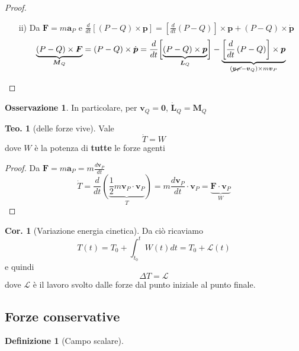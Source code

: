 \documentclass[a4paper,10pt]{article}
\theoremstyle{definition}
\theoremstyle{indentdefinition}
\newtheorem{defn}{Definizione}[section]
\theoremstyle{indenttheorem}
\newtheorem{thm}{Teo.}
\newtheorem{cor}{Cor.}
\theoremstyle{myremark}
\newtheorem*{rem*}{Osservazione}
\theoremstyle{indentgeneral}
\begin{document}
\begin{proof}
\begin{itemize}
    \item[ii)] Da $\boldsymbol{F}=m\boldsymbol{a}_{P}$ e $\frac{d}{dt}\left[\left(P-Q\right)\times\boldsymbol{p}\right]=\left[\frac{d}{dt}\left(P-Q\right)\right]\times\boldsymbol{p}+\left(P-Q\right)\times\dot{\boldsymbol{p}}$
    \[
\underset{\boldsymbol{M}_{Q}}{\underbrace{\left(P-Q\right)\times\boldsymbol{F}}}=\left(P-Q\right)\times\dot{\boldsymbol{p}}=\frac{d}{dt}\underset{\boldsymbol{L}_{Q}}{\left[\underbrace{\left(P-Q\right)\times\boldsymbol{p}}\right]}-\underset{\left(\cancel{\boldsymbol{v}_{P}}-\boldsymbol{v}_{Q}\right)\times m\boldsymbol{v}_{P}}{\underbrace{\left[\frac{d}{dt}\left(P-Q\right)\right]\times\boldsymbol{p}}}
\]
\end{itemize}
\end{proof}

\begin{rem*}
In particolare, per $\boldsymbol{v}_{Q}=\boldsymbol{0}$, $\dot{\boldsymbol{L}}_{Q}=\boldsymbol{M}_{Q}$
\end{rem*}

\begin{thm}[delle forze vive]
Vale $$\dot{T} =W$$ dove $W$ è la potenza di \textbf{tutte} le forze agenti
\end{thm}
\begin{proof}
    Da $\boldsymbol{F}=m\boldsymbol{a}_{P}=m\frac{d\boldsymbol{v}_{P}}{dt}$
\[
\dot{T}=\frac{d}{dt}\underset{T}{\left(\underbrace{\frac{1}{2}m\boldsymbol{v}_{P}\cdot\boldsymbol{v}_{P}}\right)}=m\frac{d\boldsymbol{v}_{P}}{dt}\cdot\boldsymbol{v}_{P}=\underset{W}{\underbrace{\boldsymbol{F}\cdot\boldsymbol{v}_{P}}}
\] 
\end{proof}

\begin{cor}[Variazione energia cinetica]
    Da ciò  ricaviamo
    $$T(t)=T_0+\int_{t_0}^t W(t)dt=T_0+\mathcal{L}(t)$$
    e quindi
    $$\Delta T=\mathcal{L}$$
    dove $\mathcal{L}$ è il lavoro svolto dalle forze dal punto iniziale al punto finale.
\end{cor}

\subsection{Forze conservative}

\begin{defn}[Campo scalare]
\end{defn}
\end{document}

